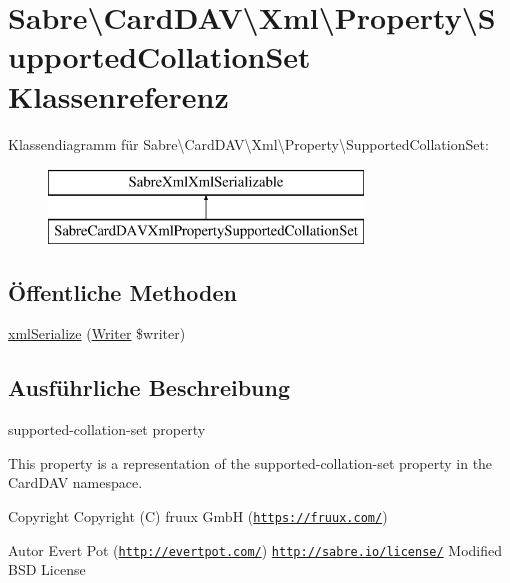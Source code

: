 \hypertarget{class_sabre_1_1_card_d_a_v_1_1_xml_1_1_property_1_1_supported_collation_set}{}\section{Sabre\textbackslash{}Card\+D\+AV\textbackslash{}Xml\textbackslash{}Property\textbackslash{}Supported\+Collation\+Set Klassenreferenz}
\label{class_sabre_1_1_card_d_a_v_1_1_xml_1_1_property_1_1_supported_collation_set}
Klassendiagramm für Sabre\textbackslash{}Card\+D\+AV\textbackslash{}Xml\textbackslash{}Property\textbackslash{}Supported\+Collation\+Set\+:\begin{figure}[H]
\begin{center}
\leavevmode
\includegraphics[height=2.000000cm]{class_sabre_1_1_card_d_a_v_1_1_xml_1_1_property_1_1_supported_collation_set}
\end{center}
\end{figure}
\subsection*{Öffentliche Methoden}
\begin{DoxyCompactItemize}
\item 
\mbox{\hyperlink{class_sabre_1_1_card_d_a_v_1_1_xml_1_1_property_1_1_supported_collation_set_a810a1c8c4de80b8a44cceeb7882c57c1}{xml\+Serialize}} (\mbox{\hyperlink{class_sabre_1_1_xml_1_1_writer}{Writer}} \$writer)
\end{DoxyCompactItemize}


\subsection{Ausführliche Beschreibung}
supported-\/collation-\/set property

This property is a representation of the supported-\/collation-\/set property in the Card\+D\+AV namespace.

\begin{DoxyCopyright}{Copyright}
Copyright (C) fruux GmbH (\href{https://fruux.com/}{\tt https\+://fruux.\+com/}) 
\end{DoxyCopyright}
\begin{DoxyAuthor}{Autor}
Evert Pot (\href{http://evertpot.com/}{\tt http\+://evertpot.\+com/})  \href{http://sabre.io/license/}{\tt http\+://sabre.\+io/license/} Modified B\+SD License 
\end{DoxyAuthor}


